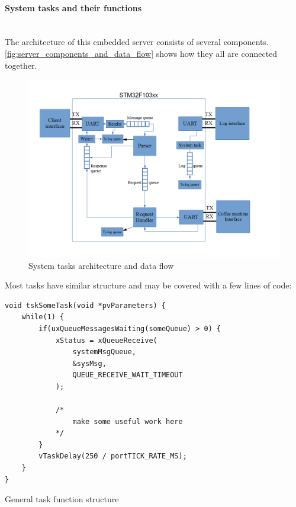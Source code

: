 \paragraph{System tasks and their functions} ~\\

The architecture of this embedded server consists of several components.
\autoref{fig:server_components_and_data_flow} shows how they all are connected
together.

\begin{center}
 \begin{figure}[h]
	\includegraphics[width=\textwidth]{../images/implementation/embedded_server/system_tasks_and_data_flow.png}
	\caption{System tasks architecture and data flow}
	\label{fig:server_components_and_data_flow}
 \end{figure}
\end{center}

Most tasks have similar structure and may be covered with a few lines of code:


\begin{listing}[H]
\begin{verbatim}
void tskSomeTask(void *pvParameters) {
	while(1) {
		if(uxQueueMessagesWaiting(someQueue) > 0) {
			xStatus = xQueueReceive( 
				systemMsgQueue, 
				&sysMsg, 
				QUEUE_RECEIVE_WAIT_TIMEOUT 
			);
			
			/* 
				make some useful work here
			*/
		}
		vTaskDelay(250 / portTICK_RATE_MS);
	}
}
\end{verbatim}
\caption{General task function structure}
\label{lst:task_function_structure}
\end{listing}

